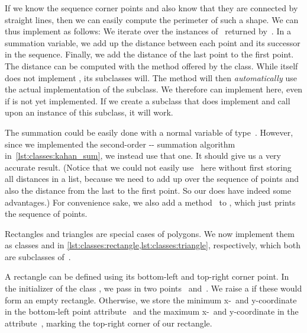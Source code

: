 If we know the sequence corner points and also know that they are connected by straight lines, then we can easily compute the perimeter of such a shape.
We can thus implement  as follows:
We iterate over the instances of~ returned by~.
In a summation variable, we add up the distance between each point and its successor in the sequence.
Finally, we add the distance of the last point to the first point.
The distance can be computed with the  method offered by the  class.
While  itself does not implement , its subclasses will.
The method  will then \emph{automatically} use the actual implementation of the subclass.
We therefore can implement  here, even if  is not yet implemented.
If we create a subclass that does implement  and call  upon an instance of this subclass, it will work.

The summation could be easily done with a normal variable of type~.
However, since we implemented the  second-order \citeauthor{K1965PFRORTE}-\citeauthor{B1968NSIMA}-\citeauthor{N1974REVZSES} summation algorithm in~\cref{lst:classes:kahan_sum}, we instead use that one.
It should give us a very accurate result.
(Notice that we could not easily use~ here without first storing all distances in a list, because we need to add up over the sequence of points and also the distance from the last to the first point.
So our  does have indeed some advantages.)
For convenience sake, we also add a method~ to , which just prints the sequence of points.

Rectangles and triangles are special cases of polygons.
We now implement them as classes  and  in \cref{lst:classes:rectangle,lst:classes:triangle}, respectively, which both are subclasses of~.

A rectangle can be defined using its bottom-left and top-right corner point.
In the initializer  of the class , we pass in two points~ and~.
We raise a  if these would form an empty rectangle.
Otherwise, we store the minimum x\nobreakdashes-~and y\nobreakdashes-coordinate in the bottom-left point attribute~ and the maximum x\nobreakdashes-~and y\nobreakdashes-coordinate in the attribute~, marking the top-right corner of our rectangle.

